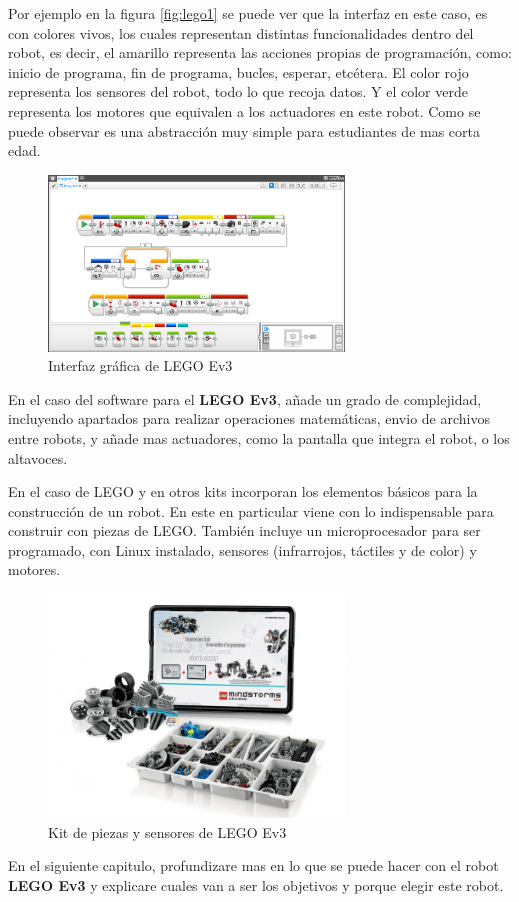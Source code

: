 \begin{itemize}
Por ejemplo en la figura \ref{fig:lego1} se puede ver que la interfaz en este caso, es con colores vivos, los cuales representan distintas funcionalidades dentro del robot, es decir, el amarillo representa las acciones propias de programación, como: inicio de programa, fin de programa, bucles, esperar, etcétera. El color rojo representa los sensores del robot, todo lo que recoja datos. Y el color verde representa los motores que equivalen a los actuadores en este robot.
Como se puede observar es una abstracción muy simple para estudiantes de mas corta edad.
	 \begin{figure}[H]
    \centering
    \includegraphics[width=0.7\textwidth]{img/lego2.jpg}
    \caption{Interfaz gráfica de LEGO Ev3} \label{fig:lego2}
    \end{figure}

En el caso del software para el \textbf{LEGO Ev3}, añade un grado de complejidad, incluyendo apartados para realizar operaciones matemáticas, envio de archivos entre robots, y añade mas actuadores, como la pantalla que integra el robot, o los altavoces.

En el caso de LEGO y en otros kits incorporan los elementos básicos para la construcción de un robot. En este en particular viene con lo indispensable para construir con piezas de LEGO. También incluye un microprocesador para ser programado, con Linux instalado, sensores (infrarrojos, táctiles y de color) y motores.
  \begin{figure}[H]
    \centering
    \includegraphics[width=0.7\textwidth]{img/kitev3.jpg}
    \caption{Kit de piezas y sensores de LEGO Ev3} \label{fig:lego3}
    \end{figure}
\end{itemize}{}


En el siguiente capitulo, profundizare mas en lo que se puede hacer con el robot \textbf{LEGO Ev3} y explicare cuales van a ser los objetivos y porque elegir este robot.


